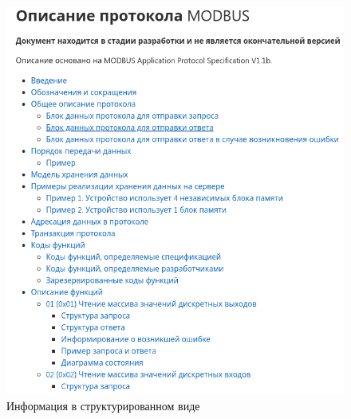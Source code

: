 \documentclass[../AISTR.tex]{subfiles}
\begin{document}
\begin{figure}
	\centering
	\includegraphics[width=0.9\linewidth]{../images/result}
	\caption{Информация в структурированном виде}
	\label{fig:result}
\end{figure}
\end{document}
